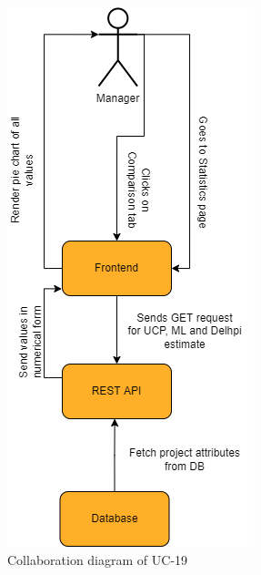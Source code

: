 \begin{figure}[H]
    \centering
    \includegraphics[scale=0.5]{./diagrams/collaboration/cd-19.png}
    \caption{Collaboration diagram of UC-19}
    \label{fig:cd-19}
    
\end{figure}

